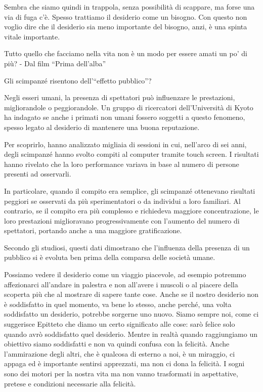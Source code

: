 \documentclass[12pt]{book} %
\begin{document}
Sembra che siamo quindi in trappola, senza possibilità di scappare, ma forse una via di fuga c'è.
Spesso trattiamo il desiderio come un bisogno. Con questo non voglio dire che il desiderio sia meno importante del
bisogno, anzi, è una spinta vitale importante.

Tutto quello che facciamo nella vita non è un modo per essere amati un po' di più? - Dal film “Prima dell'alba”

\begin{mdframed}[linewidth=1pt]
Gli scimpanzé risentono dell’“effetto pubblico”?

Negli esseri umani, la presenza di spettatori può influenzare le prestazioni, migliorandole o peggiorandole. Un gruppo di ricercatori dell’Università di Kyoto ha indagato se anche i primati non umani fossero soggetti a questo fenomeno, spesso legato al desiderio di mantenere una buona reputazione.

Per scoprirlo, hanno analizzato migliaia di sessioni in cui, nell’arco di sei anni, degli scimpanzé hanno svolto compiti al computer tramite touch screen. I risultati hanno rivelato che la loro performance variava in base al numero di persone presenti ad osservarli.

In particolare, quando il compito era semplice, gli scimpanzé ottenevano risultati peggiori se osservati da più sperimentatori o da individui a loro familiari. Al contrario, se il compito era più complesso e richiedeva maggiore concentrazione, le loro prestazioni miglioravano progressivamente con l’aumento del numero di spettatori, portando anche a una maggiore gratificazione.

Secondo gli studiosi, questi dati dimostrano che l’influenza della presenza di un pubblico si è evoluta ben prima della comparsa delle società umane.
\end{mdframed}

Possiamo vedere il desiderio come un viaggio piacevole, ad esempio potremmo affezionarci
 all'andare in palestra e non all'avere i muscoli o al piacere della scoperta più che al mostrare di
 sapere tante cose. Anche se il nostro desiderio non è soddisfatto in quel momento, va bene lo stesso, anche perché, una volta soddisfatto un desiderio, potrebbe sorgerne uno nuovo. Siamo sempre noi, come ci suggerisce Epitteto
che diamo un certo significato alle cose: sarò felice solo quando avrò soddisfatto quel desiderio. Mentre in realtà
quando raggiungiamo un obiettivo siamo soddisfatti e non va quindi confusa con la felicità. Anche
l'ammirazione degli altri, che è qualcosa di esterno a noi, è un miraggio, ci appaga ed è
importante sentirsi apprezzati, ma non ci dona la felicità. I sogni sono dei motori per la nostra vita ma non vanno
trasformati in aspettative, pretese e condizioni necessarie alla felicità.
\end{document}
